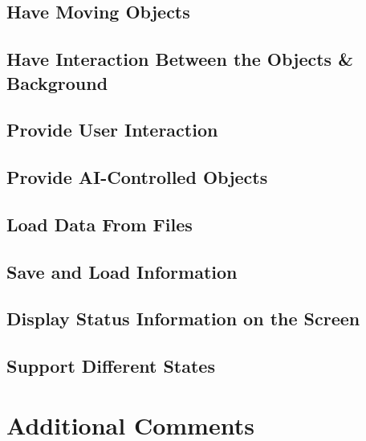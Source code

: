 \documentclass[a4paper,11pt]{article}
\begin{document}
    \subsection{Have Moving Objects}
    \subsection{Have Interaction Between the Objects \& Background}
    \subsection{Provide User Interaction}
    \subsection{Provide AI-Controlled Objects}
    \subsection{Load Data From Files}
    \subsection{Save and Load Information}
    \subsection{Display Status Information on the Screen}
    \subsection{Support Different States}

    \section{Additional Comments}
\end{document}
